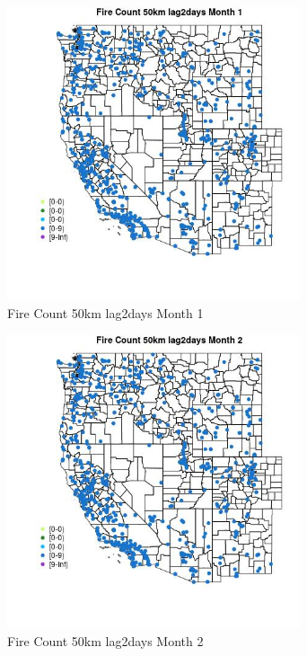 \begin{figure} 
\centering  
\includegraphics[width=0.77\textwidth]{Code_Outputs/Report_ML_input_PM25_Step4_part_e_de_duplicated_aves_compiled_2019-05-21wNAs_MapObsMo1Fire_Count_50km_lag2days.jpg} 
\caption{\label{fig:Report_ML_input_PM25_Step4_part_e_de_duplicated_aves_compiled_2019-05-21wNAsMapObsMo1Fire_Count_50km_lag2days}Fire Count 50km lag2days Month 1} 
\end{figure} 
 

\begin{figure} 
\centering  
\includegraphics[width=0.77\textwidth]{Code_Outputs/Report_ML_input_PM25_Step4_part_e_de_duplicated_aves_compiled_2019-05-21wNAs_MapObsMo2Fire_Count_50km_lag2days.jpg} 
\caption{\label{fig:Report_ML_input_PM25_Step4_part_e_de_duplicated_aves_compiled_2019-05-21wNAsMapObsMo2Fire_Count_50km_lag2days}Fire Count 50km lag2days Month 2} 
\end{figure} 
 

